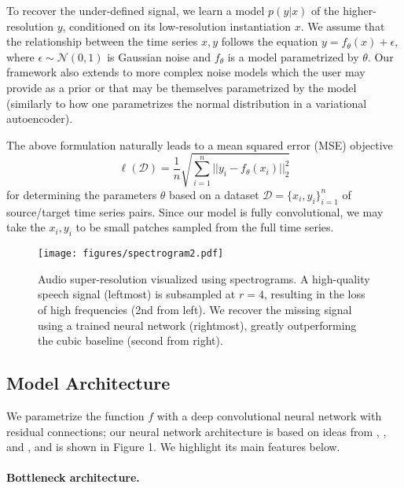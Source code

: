 \documentclass{article} \usepackage{iclr2017_workshop,times}
\begin{document}
To recover the under-defined signal, we learn a model $p(y \vert x)$ of the higher-resolution $y$, conditioned on its low-resolution instantiation $x$. 
We assume that the relationship between the time series $x, y$ follows the equation
$y = f_\theta(x) + \epsilon,$
where $\epsilon \sim \mathcal{N}(0,1)$ is Gaussian noise and $f_\theta$ is a model parametrized by $\theta$. Our framework also extends to more complex noise models which the user may provide as a prior or that may be themselves parametrized by the model (similarly to how one parametrizes the normal distribution in a variational autoencoder).

The above formulation naturally leads to a mean squared error (MSE) objective  
\begin{equation}
\ell(\mathcal{D}) = \frac{1}{n} \sqrt{ \sum_{i=1}^n ||y_i - f_\theta(x_i)||_2^2 }
\end{equation}
for determining the parameters $\theta$ based on a dataset $\mathcal{D} = \{x_i, y_i\}_{i=1}^n$ of source/target time series pairs. Since our model is fully convolutional, we may take the $x_i, y_i$ to be small patches sampled from the full time series.

\begin{figure}[t]
\begin{center}
\texttt{[image: figures/spectrogram2.pdf]}
\end{center}
\vspace{-5mm}
\caption{Audio super-resolution visualized using spectrograms. A high-quality speech signal (leftmost) is subsampled at $r=4$, resulting in the loss of high frequencies (2nd from left). We recover the missing signal using a trained neural network (rightmost), greatly outperforming the cubic baseline (second from right). }
\end{figure}

\subsection{Model Architecture} 

We parametrize the function $f$ with a deep convolutional neural network with residual connections; our neural network architecture is based on ideas from \citet{ShiCHTABRW16}, \citet{Dong:2016:ISU:2914182.2914303}, and \citet{pix2pix2016}, and is shown in Figure 1.
We highlight its main features below.




\paragraph{Bottleneck architecture.}
\end{document}
